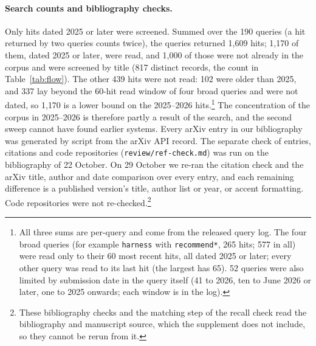 \documentclass[sigconf,nonacm]{acmart}
\begin{document}
\paragraph{Search counts and bibliography checks.} Only hits dated 2025 or later were screened. Summed over the 190 queries (a hit returned by two queries counts twice), the queries returned 1{,}609 hits; 1{,}170 of them, dated 2025 or later, were read, and 1{,}000 of those were not already in the corpus and were screened by title (817 distinct records, the count in Table~\ref{tab:flow}). The other 439 hits were not read: 102 were older than 2025, and 337 lay beyond the 60-hit read window of four broad queries and were not dated, so 1{,}170 is a lower bound on the 2025--2026 hits.\footnote{All three sums are per-query and come from the released query log. The four
broad queries (for example \texttt{harness} with \texttt{recommend*}, 265 hits; 577 in all) were read only to their 60 most recent
hits, all dated 2025 or later; every other query was read to its last hit (the largest has 65). 52 queries were also limited by submission date in the query itself (41 to 2026, ten to June 2026 or later, one to 2025 onwards; each window is in the log).} The concentration of the corpus in 2025--2026 is therefore partly a result of the search, and the second sweep cannot have found earlier systems.
Every
arXiv entry in our bibliography was generated by script from the arXiv API record. The separate check of entries, citations and code repositories (\texttt{review/ref-check.md}) was run on the bibliography of 22 October. On 29 October we re-ran the citation check and the arXiv title, author and date comparison over every entry, and each remaining difference is a published version's title, author list or year, or accent formatting. Code repositories were not re-checked.\footnote{These bibliography checks and the matching step of the recall check read the bibliography and manuscript source, which the supplement does not include, so they cannot be rerun from it.}
\end{document}
